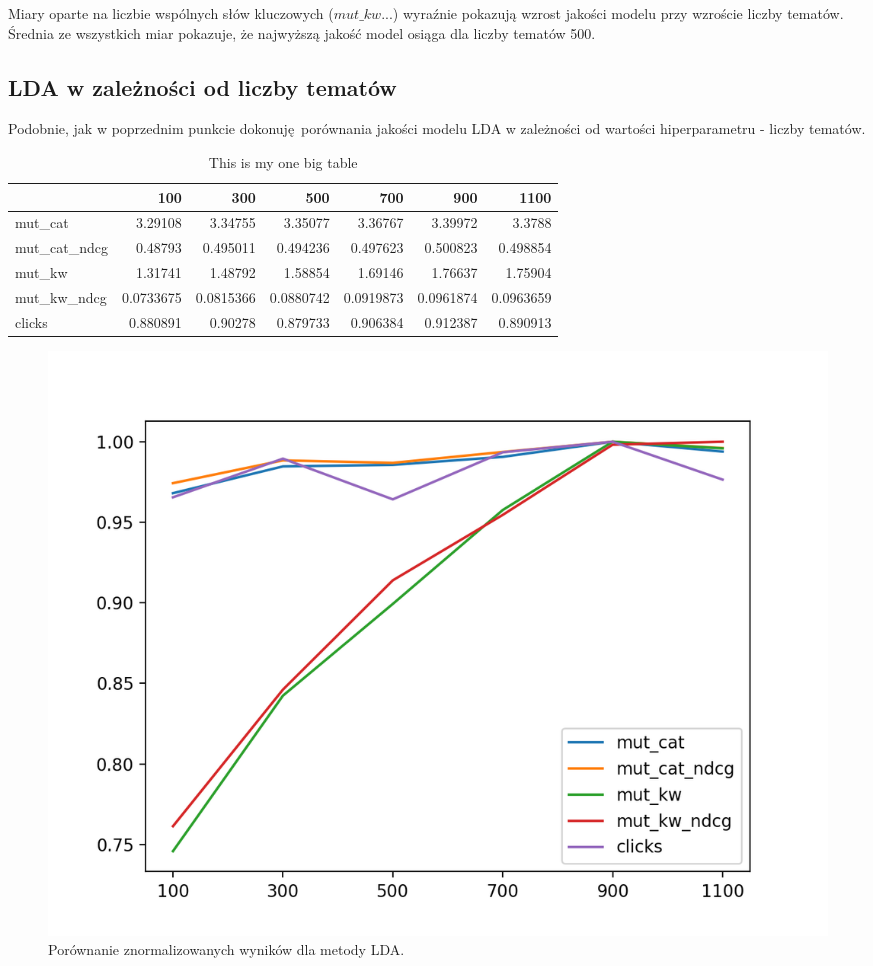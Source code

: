 \documentclass[pl]{minipw} %
\begin{document}
Miary oparte na liczbie wspólnych słów kluczowych ($mut\_kw...$) wyraźnie pokazują wzrost jakości modelu przy wzroście liczby tematów. Średnia ze wszystkich miar pokazuje, że najwyższą jakość model osiąga dla liczby tematów 500.

\subsection{LDA w zależności od liczby tematów}

Podobnie, jak w poprzednim punkcie dokonuję porównania jakości modelu LDA w zależności od wartości hiperparametru - liczby tematów.


\begin{table}
	\centering
	\begin{tabular}{lrrrrrr}
		\hline
		&       100 &       300 &       500 &       700 &       900 &      1100 \\
		\hline
		mut\_cat      & 3.29108   & 3.34755   & 3.35077   & 3.36767   & 3.39972   & 3.3788    \\
		mut\_cat\_ndcg & 0.48793   & 0.495011  & 0.494236  & 0.497623  & 0.500823  & 0.498854  \\
		mut\_kw       & 1.31741   & 1.48792   & 1.58854   & 1.69146   & 1.76637   & 1.75904   \\
		mut\_kw\_ndcg  & 0.0733675 & 0.0815366 & 0.0880742 & 0.0919873 & 0.0961874 & 0.0963659 \\
		clicks       & 0.880891  & 0.90278   & 0.879733  & 0.906384  & 0.912387  & 0.890913  \\
		\hline
	\end{tabular}
	\caption{This is my one big table}
\end{table}

\begin{figure}[H]
	\centering
	\includegraphics[width=1\textwidth]{img/results/lda.png}
	\caption{Porównanie znormalizowanych wyników dla metody LDA.}
\end{figure}
\end{document}
